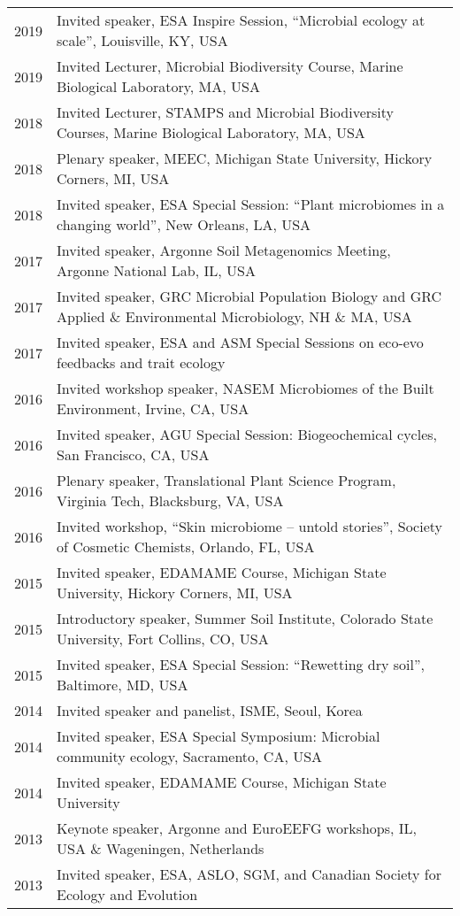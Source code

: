 \documentclass[11pt]{article}
\begin{document}
\begin{longtable}{@{}p{3em}@{\hspace{1.5em}}p{}@{}}
2019 & Invited speaker, ESA Inspire Session, “Microbial ecology at scale”, Louisville, KY, USA \\
2019 & Invited Lecturer, Microbial Biodiversity Course, Marine Biological Laboratory, MA, USA \\
2018 & Invited Lecturer, STAMPS and Microbial Biodiversity Courses, Marine Biological Laboratory, MA, USA \\
2018 & Plenary speaker, MEEC, Michigan State University, Hickory Corners, MI, USA \\
2018 & Invited speaker, ESA Special Session: “Plant microbiomes in a changing world”, New Orleans, LA, USA \\
2017 & Invited speaker, Argonne Soil Metagenomics Meeting, Argonne National Lab, IL, USA \\
2017 & Invited speaker, GRC Microbial Population Biology and GRC Applied \& Environmental Microbiology, NH \& MA, USA \\
2017 & Invited speaker, ESA and ASM Special Sessions on eco-evo feedbacks and trait ecology \\
2016 & Invited workshop speaker, NASEM Microbiomes of the Built Environment, Irvine, CA, USA \\
2016 & Invited speaker, AGU Special Session: Biogeochemical cycles, San Francisco, CA, USA \\
2016 & Plenary speaker, Translational Plant Science Program, Virginia Tech, Blacksburg, VA, USA \\
2016 & Invited workshop, “Skin microbiome – untold stories”, Society of Cosmetic Chemists, Orlando, FL, USA \\
2015 & Invited speaker, EDAMAME Course, Michigan State University, Hickory Corners, MI, USA \\
2015 & Introductory speaker, Summer Soil Institute, Colorado State University, Fort Collins, CO, USA \\
2015 & Invited speaker, ESA Special Session: “Rewetting dry soil”, Baltimore, MD, USA \\
2014 & Invited speaker and panelist, ISME, Seoul, Korea \\
2014 & Invited speaker, ESA Special Symposium: Microbial community ecology, Sacramento, CA, USA \\
2014 & Invited speaker, EDAMAME Course, Michigan State University \\
2013 & Keynote speaker, Argonne and EuroEEFG workshops, IL, USA \& Wageningen, Netherlands \\
2013 & Invited speaker, ESA, ASLO, SGM, and Canadian Society for Ecology and Evolution \\

\end{longtable}
\end{document}
